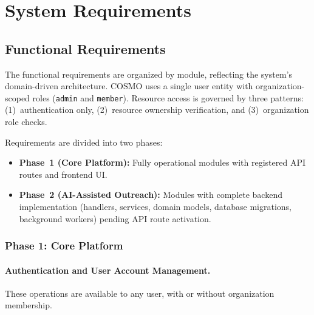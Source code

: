 \section{System Requirements}

\subsection{Functional Requirements}

The functional requirements are organized by module, reflecting the system's domain-driven architecture. COSMO uses a single user entity with organization-scoped roles (\texttt{admin} and \texttt{member}). Resource access is governed by three patterns: (1)~authentication only, (2)~resource ownership verification, and (3)~organization role checks.

Requirements are divided into two phases:
\begin{itemize}
    \item \textbf{Phase~1 (Core Platform):} Fully operational modules with registered API routes and frontend UI.
    \item \textbf{Phase~2 (AI-Assisted Outreach):} Modules with complete backend implementation (handlers, services, domain models, database migrations, background workers) pending API route activation.
\end{itemize}


\subsubsection{Phase 1: Core Platform}

\paragraph{Authentication and User Account Management.}
These operations are available to any user, with or without organization membership.

